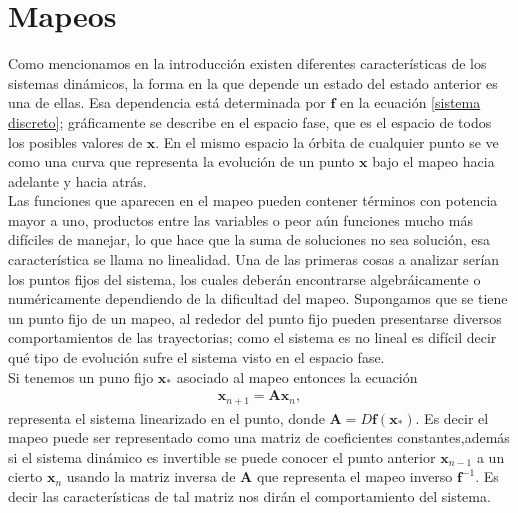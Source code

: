\section{Mapeos}
Como mencionamos en la introducción existen diferentes características de los sistemas dinámicos, la forma en la que depende un estado del estado anterior es una de ellas. Esa dependencia está determinada por $\mathbf{f}$ en la ecuación \eqref{sistema discreto}; gráficamente se describe en el espacio fase, que es el espacio de todos los posibles valores de $\pmb x$. En el mismo espacio la órbita de cualquier punto se ve como una curva que representa la evolución de un punto $\pmb x$ bajo el mapeo hacia adelante y hacia atrás. \\

Las funciones que aparecen en el mapeo pueden contener términos con potencia mayor a uno, productos entre las variables o peor aún funciones mucho más difíciles de manejar, lo que hace que la suma de soluciones no sea solución, esa característica se llama no linealidad. Una de las primeras cosas a analizar serían los puntos fijos del sistema, los cuales deberán encontrarse algebráicamente o numéricamente dependiendo de la dificultad del mapeo. Supongamos que se tiene un punto fijo de un mapeo, al rededor del punto fijo pueden presentarse diversos comportamientos de las trayectorias; como el sistema es no lineal es difícil decir qué tipo de evolución sufre el sistema visto en el espacio fase.\\


Si tenemos un puno fijo $\mathbf{x}_{*}$ asociado al mapeo entonces la ecuación
\begin{eqnarray}
\mathbf{x}_{n+1} =\mathbf{A}\mathbf{x}_{n},
\end{eqnarray}
representa el sistema linearizado en el punto, donde $\mathbf{A}=D\mathbf{f}(\mathbf{x}_{*})$. Es decir el mapeo puede ser representado como una matriz de coeficientes constantes,además si el sistema dinámico es invertible se puede conocer el punto anterior $\mathbf{x}_{n-1}$ a un cierto $\mathbf{x}_{n}$ usando la matriz inversa de $\mathbf{A}$ que representa el mapeo inverso $\mathbf{f}^{-1}$. Es decir las características de tal matriz nos dirán el comportamiento del sistema. \\

